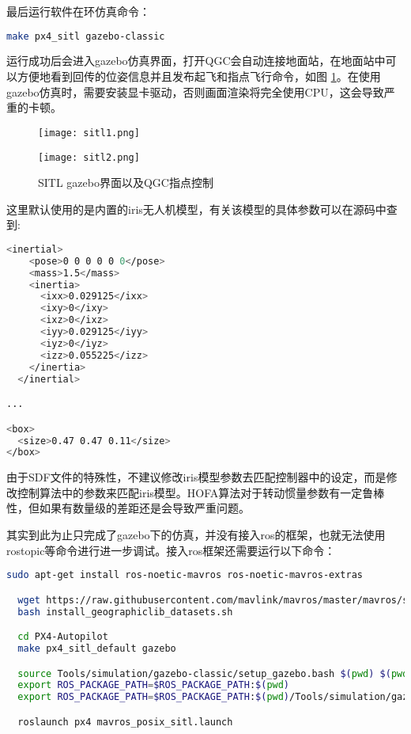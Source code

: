 最后运行软件在环仿真命令：

\begin{lstlisting}[language=Bash, basicstyle=\footnotesize, linewidth=\linewidth]
  make px4_sitl gazebo-classic
\end{lstlisting}

运行成功后会进入gazebo仿真界面，打开QGC会自动连接地面站，在地面站中可以方便地看到回传的位姿信息并且发布起飞和指点飞行命令，如图 \ref{sitl}。在使用gazebo仿真时，需要安装显卡驱动，否则画面渲染将完全使用CPU，这会导致严重的卡顿。

\begin{figure}[h]
  \centering
     \begin{minipage}[c]{0.45\textwidth}
      \centering
      \texttt{[image: sitl1.png]}
   \end{minipage}%
     \begin{minipage}[c]{0.45\textwidth}
      \centering
      \texttt{[image: sitl2.png]}
   \end{minipage}
   \caption{SITL gazebo界面以及QGC指点控制}
   \label{sitl}
 \end{figure}

 这里默认使用的是内置的iris无人机模型，有关该模型的具体参数可以在源码\cite{iris}中查到:
 \begin{lstlisting}[language=Bash, basicstyle=\footnotesize, linewidth=\linewidth]
  <inertial>
    <pose>0 0 0 0 0 0</pose>
    <mass>1.5</mass>
    <inertia>
      <ixx>0.029125</ixx>
      <ixy>0</ixy>
      <ixz>0</ixz>
      <iyy>0.029125</iyy>
      <iyz>0</iyz>
      <izz>0.055225</izz>
    </inertia>
  </inertial>

...

<box>
  <size>0.47 0.47 0.11</size>
</box>
 \end{lstlisting}
 
由于SDF文件的特殊性，不建议修改iris模型参数去匹配控制器中的设定，而是修改控制算法中的参数来匹配iris模型。HOFA算法对于转动惯量参数有一定鲁棒性，但如果有数量级的差距还是会导致严重问题。

其实到此为止只完成了gazebo下的仿真，并没有接入ros的框架，也就无法使用rostopic等命令进行进一步调试。接入ros框架还需要运行以下命令：

\begin{lstlisting}[language=Bash, basicstyle=\footnotesize, linewidth=\linewidth, breaklines=true]
  sudo apt-get install ros-noetic-mavros ros-noetic-mavros-extras

  wget https://raw.githubusercontent.com/mavlink/mavros/master/mavros/scripts/install_geographiclib_datasets.sh
  bash install_geographiclib_datasets.sh

  cd PX4-Autopilot
  make px4_sitl_default gazebo

  source Tools/simulation/gazebo-classic/setup_gazebo.bash $(pwd) $(pwd)/build/px4_sitl_default
  export ROS_PACKAGE_PATH=$ROS_PACKAGE_PATH:$(pwd)
  export ROS_PACKAGE_PATH=$ROS_PACKAGE_PATH:$(pwd)/Tools/simulation/gazebo-classic/sitl_gazebo-classic

  roslaunch px4 mavros_posix_sitl.launch
\end{lstlisting}

